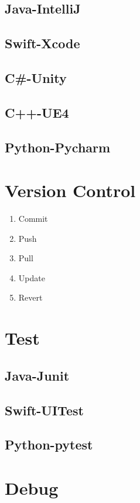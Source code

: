 \documentclass[12pt, a4paper]{report}
\begin{document}
    \subsection{Java-IntelliJ}
    \subsection{Swift-Xcode}
    \subsection{C\#-Unity}
    \subsection{C++-UE4}
    \subsection{Python-Pycharm}
\section{Version Control}
    \begin{enumerate}
        \item Commit
        \item Push
        \item Pull
        \item Update
        \item Revert
    \end{enumerate}
    
\section{Test}
    \subsection{Java-Junit}
    \subsection{Swift-UITest}
    \subsection{Python-pytest}
    
\section{Debug}
\end{document}
